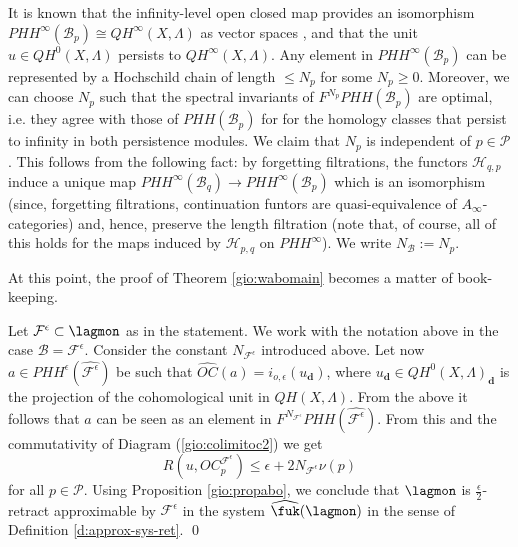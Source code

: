 It is known that the infinity-level open closed map provides an isomorphism $PHH^\infty(\mathcal{B}_p)\cong QH^\infty(X,\Lambda)$ as vector spaces \cite{Gan:thesis}, and that the unit $u\in QH^0(X,\Lambda)$ persists to $QH^\infty(X,\Lambda)$. Any element in $PHH^\infty(\mathcal{B}_p)$ can be represented by a Hochschild chain of length $\leq N_p$ for some $N_p\geq 0$. Moreover, we can choose $N_p$ such that the spectral invariants of $F^{N_p}PHH(\mathcal{B}_p)$ are optimal, i.e. they agree with those of $PHH(\mathcal{B}_p)$ for for the homology classes that persist to infinity in both persistence modules. We claim that $N_p$ is independent of $p\in \mathcal{P}$. This follows from the following fact: by forgetting filtrations, the functors $\mathcal{H}_{q,p}$ induce a unique map $PHH^\infty(\mathcal{B}_q) \to PHH^\infty(\mathcal{B}_p)$ which is an isomorphism  (since, forgetting filtrations, continuation funtors are quasi-equivalence of $A_\infty$-categories) and, hence, preserve the length filtration (note that, of course, all of this holds for the maps induced by $\mathcal{H}_{p,q}$ on $PHH^\infty$). We write $N_\mathcal{B}:=N_p$.

At this point, the proof of Theorem \ref{gio:wabomain} becomes a matter of book-keeping.

	Let $\mathcal{F}^\epsilon\subset \lagmon$ as in the statement. We work with the notation above in the case $\mathcal{B}=\mathcal{F}^\epsilon$. Consider the constant $N_{\mathcal{F}^\epsilon}$ introduced above. Let now $a\in PHH^\epsilon(\widehat{\mathcal{F}^\epsilon})$ be such that $\widehat{OC}(a)=i_{o,\epsilon}(u_\mathbf{d})$, where $u_\mathbf{d}\in QH^0(X,\Lambda)_\mathbf{d}$ is the projection of the cohomological unit in $QH(X,\Lambda)$. From the above it follows that $a$ can be seen as an element in $F^{N_{\mathcal{F}^\epsilon}}PHH(\widehat{\mathcal{F}^\epsilon})$. From this and the commutativity of Diagram (\ref{gio:colimitoc2}) we get $$R(u, OC^{\mathcal{F}^\epsilon}_p)\leq \epsilon+2N_{\mathcal{F}^\epsilon}\nu(p)$$ for all $p\in \mathcal{P}$. Using Proposition \ref{gio:propabo}, we conclude that $\lagmon$ is $\frac{\epsilon}{2}$-retract approximable by $\mathcal{F}^\epsilon$ in the system $\widehat{\fuk}(\lagmon)$ in the sense of Definition \ref{d:approx-sys-ret}. \qed




